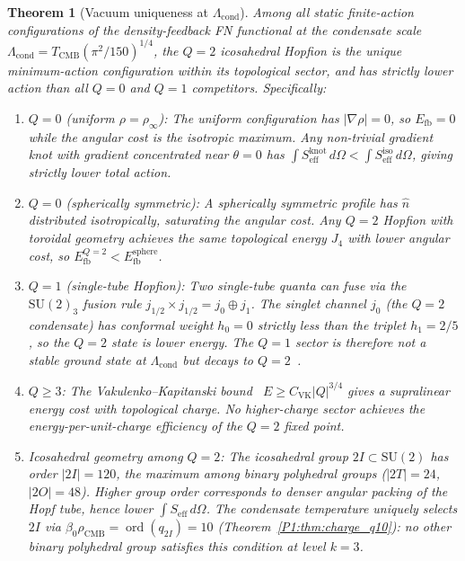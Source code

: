 \documentclass[11pt,a4paper]{article}
\newtheorem{theorem}{Theorem}[section]
\theoremstyle{definition}
\theoremstyle{remark}
\newcommand{\bz}{\beta_{0}}
\newcommand{\TCMB}{T_{\mathrm{CMB}}}
\newcommand{\rCMB}{\rho_{\mathrm{CMB}}}
\newcommand{\ord}{\operatorname{ord}}
\newcommand{\Lcond}{\Lambda_{\mathrm{cond}}}
\begin{document}
\begin{theorem}[Vacuum uniqueness at $\Lcond$]
\label{P1:thm:vacuum}
Among all static finite-action configurations of the density-feedback
FN functional at the condensate scale $\Lcond = \TCMB(\pi^2/150)^{1/4}$,
the $Q=2$ icosahedral Hopfion is the unique minimum-action configuration
within its topological sector, and has strictly lower action than all
$Q=0$ and $Q=1$ competitors. Specifically:
\begin{enumerate}[noitemsep,label=\emph{(\roman*)}]
  \item \textit{$Q=0$ (uniform $\rho=\rho_\infty$):} The uniform
    configuration has $|\nabla\rho|=0$, so $E_{\mathrm{fb}}=0$ while the
    angular cost is the isotropic maximum.  Any non-trivial gradient
    knot with gradient concentrated near $\theta=0$ has
    $\int S_{\mathrm{eff}}^{\mathrm{knot}}\,d\Omega <
    \int S_{\mathrm{eff}}^{\mathrm{iso}}\,d\Omega$, giving
    strictly lower total action.
  \item \textit{$Q=0$ (spherically symmetric):} A spherically symmetric
    profile has $\hat{n}$ distributed isotropically, saturating the
    angular cost.  Any $Q=2$ Hopfion with toroidal geometry achieves the
    same topological energy $J_4$ with lower angular cost, so
    $E_{\mathrm{fb}}^{Q=2} < E_{\mathrm{fb}}^{\mathrm{sphere}}$.
  \item \textit{$Q=1$ (single-tube Hopfion):} Two single-tube quanta
    can fuse via the $\mathrm{SU}(2)_3$ fusion rule
    $j_{1/2}\times j_{1/2} = j_0\oplus j_1$.
    The singlet channel $j_0$ (the $Q=2$ condensate) has conformal
    weight $h_0=0$ strictly less than the triplet $h_1 = 2/5$,
    so the $Q=2$ state is lower energy.
    The $Q=1$ sector is therefore not a stable ground state at $\Lcond$
    but decays to $Q=2$~\cite{Paper2}.
  \item \textit{$Q\geq 3$:} The Vakulenko--Kapitanski bound~\cite{VK1979}
    $E\geq C_{\mathrm{VK}}|Q|^{3/4}$ gives a supralinear energy cost
    with topological charge.  No higher-charge sector achieves the
    energy-per-unit-charge efficiency of the $Q=2$ fixed point.
  \item \textit{Icosahedral geometry among $Q=2$:} The icosahedral group
    $2I\subset\mathrm{SU}(2)$ has order $|2I|=120$, the maximum among
    binary polyhedral groups ($|2T|=24$, $|2O|=48$).  Higher group order
    corresponds to denser angular packing of the Hopf tube, hence lower
    $\int S_{\mathrm{eff}}\,d\Omega$.  The condensate temperature
    uniquely selects $2I$ via $\bz\rCMB = \ord(q_{2I})=10$
    (Theorem~\ref{P1:thm:charge_q10}): no other binary polyhedral group
    satisfies this condition at level $k=3$.
\end{enumerate}
\end{theorem}
\end{document}
